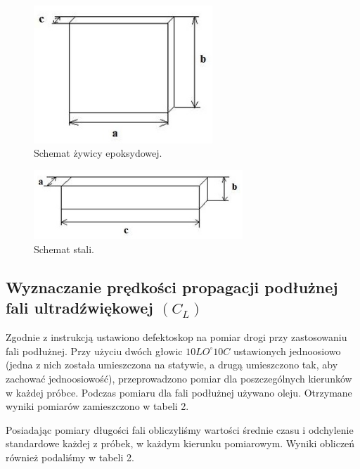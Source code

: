 \documentclass[a4paper,12pt]{article}
\begin{document}
\begin{figure}[H]
    \centering
    \includegraphics[width=0.6\textwidth]{img/zywica.jpg}
    \caption{Schemat żywicy epoksydowej.}
\end{figure}

\begin{figure}[H]
    \centering
    \includegraphics[width=0.7\textwidth]{img/dlugiAl2O3_stal.jpg}
    \caption{Schemat stali.}
\end{figure}



\subsection{Wyznaczanie prędkości propagacji podłużnej fali ultradźwiękowej $(C_L)$}

Zgodnie z instrukcją ustawiono defektoskop na pomiar drogi przy zastosowaniu fali podłużnej. Przy użyciu dwóch głowic $10LO^\circ10C$ ustawionych jednoosiowo (jedna z nich została umieszczona na statywie, a drugą umieszczono tak, aby zachować jednoosiowość), przeprowadzono pomiar dla poszczególnych kierunków w każdej próbce. Podczas pomiaru dla fali podłużnej używano oleju. Otrzymane wyniki pomiarów zamieszczono w tabeli 2.

Posiadając pomiary długości fali obliczyliśmy wartości średnie czasu i odchylenie standardowe każdej z próbek, w każdym kierunku pomiarowym. Wyniki obliczeń również podaliśmy w tabeli 2.




\end{document}
